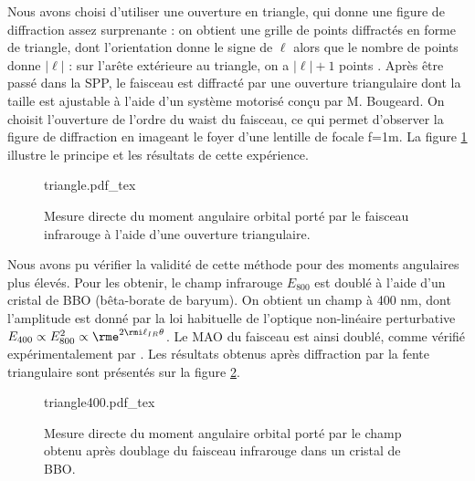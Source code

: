 Nous avons choisi d'utiliser une ouverture en triangle, qui donne une figure de diffraction assez surprenante : on obtient une grille de points diffractés en forme de triangle, dont l'orientation donne le  signe de $\ell$ alors que le nombre de points donne $\left|\ell\right|$ : sur l'arête extérieure au triangle, on a $\left|\ell\right|+1$ points . Après être passé dans la SPP, le faisceau est diffracté par une ouverture triangulaire dont la taille est ajustable à l'aide d'un système motorisé conçu par M. Bougeard. On choisit l'ouverture de l'ordre du waist du faisceau, ce qui permet d'observer la figure de diffraction en imageant le foyer d'une lentille de focale f=1m. La figure \ref{Fig:Triangle} illustre le principe et les résultats de cette expérience. 

\begin{figure}[!ht]
\centering
\def\svgwidth{1.0\columnwidth}
{triangle.pdf_tex}
\caption{Mesure directe du moment angulaire orbital porté par le faisceau infrarouge à l'aide d'une ouverture triangulaire.}
\label{Fig:Triangle}
\end{figure}

Nous avons pu vérifier la validité de cette méthode pour des moments angulaires plus élevés. Pour les obtenir, le champ infrarouge $E_{800}$ est doublé à l'aide d'un cristal de BBO (bêta-borate de baryum). On obtient un champ à 400 nm, dont l'amplitude est donné par la loi habituelle de l'optique non-linéaire perturbative $E_{400}\propto E_{800}^2\propto \rme^{2\rmi\ell_{IR}\theta}$. Le MAO du faisceau est ainsi doublé, comme vérifié expérimentalement par . Les résultats obtenus après diffraction par la fente triangulaire sont présentés sur la figure \ref{Fig:Triangle400}. 

\begin{figure}[!ht]
\centering
\def\svgwidth{0.5\columnwidth}
{triangle400.pdf_tex}
\caption{Mesure directe du moment angulaire orbital porté par le champ obtenu après doublage du faisceau infrarouge dans un cristal de BBO.}
\label{Fig:Triangle400}
\end{figure}

